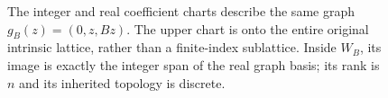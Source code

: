 \begin{figure}[htbp]
\centering
{}
\caption{The integer and real coefficient charts describe the same graph
\(g_B(z)=(0,z,Bz)\). The upper chart is onto the entire original intrinsic
lattice, rather than a finite-index sublattice. Inside \(W_B\), its image is
exactly the integer span of the real graph basis; its rank is \(n\) and its
inherited topology is discrete.}
\label{fig:coupled-lattice-chart}
\end{figure}
